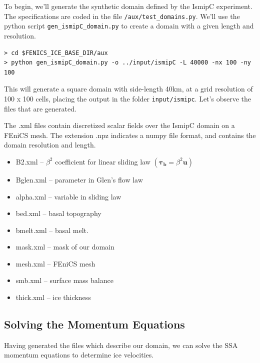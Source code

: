 \documentclass[11pt, reqno, nocenter]{article}
\begin{document}
To begin, we'll generate the synthetic domain defined by the IsmipC experiment. The specifications are coded in the file {\tt /aux/test\_domains.py}. We'll use the python script {\tt gen\_ismipC\_domain.py} to create a domain with a given length and resolution.

\begin{verbatim}
> cd $FENICS_ICE_BASE_DIR/aux 
> python gen_ismipC_domain.py -o ../input/ismipC -L 40000 -nx 100 -ny 100 
\end{verbatim}

This will generate a square domain with side-length 40\si{\kilo\metre}, at a grid resolution of 100 x 100 cells, placing the output in the folder {\tt input/ismipc}.
Let's observe the files that are generated.


The .xml files contain discretized scalar fields over the IsmipC domain on a FEniCS mesh. The extension .npz indicates a numpy file format, and contains the domain resolution and length.

\begin{itemize}
\item B2.xml -- $\beta^2$ coefficient for linear sliding law $( = \beta^2 )$
\item  Bglen.xml -- parameter in Glen's flow law
\item alpha.xml -- variable in sliding law 
\item bed.xml -- basal topography
\item bmelt.xml -- basal melt. 
\item mask.xml -- mask of our domain
\item mesh.xml -- FEniCS mesh
\item smb.xml -- surface mass balance
\item thick.xml -- ice thickness

\end{itemize}

\subsection{Solving the Momentum Equations}

Having generated the files which describe our domain, we can solve the SSA momentum equations to determine ice velocities. 
\end{document}
